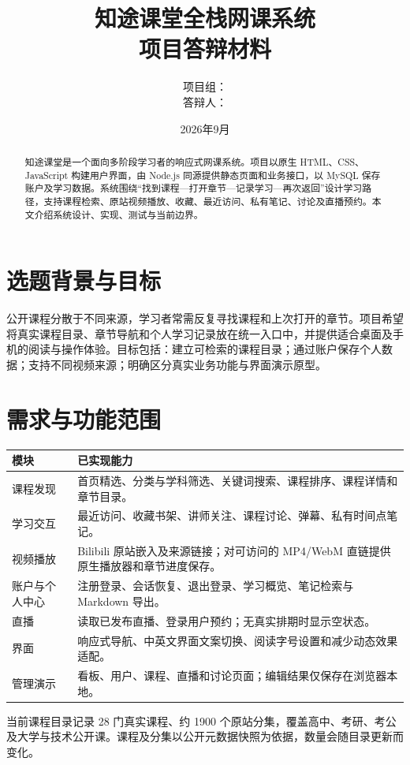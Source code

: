 \documentclass[UTF8,12pt,a4paper]{ctexart}
\title{知途课堂全栈网课系统\\项目答辩材料}
\author{项目组：\underline{\hspace{6cm}}\\答辩人：\underline{\hspace{6cm}}}
\date{2026年9月}
\begin{document}
\maketitle
\begin{abstract}
知途课堂是一个面向多阶段学习者的响应式网课系统。项目以原生 HTML、CSS、JavaScript 构建用户界面，由 Node.js 同源提供静态页面和业务接口，以 MySQL 保存账户及学习数据。系统围绕“找到课程—打开章节—记录学习—再次返回”设计学习路径，支持课程检索、原站视频播放、收藏、最近访问、私有笔记、讨论及直播预约。本文介绍系统设计、实现、测试与当前边界。
\end{abstract}
\tableofcontents
\newpage
\section{选题背景与目标}
公开课程分散于不同来源，学习者常需反复寻找课程和上次打开的章节。项目希望将真实课程目录、章节导航和个人学习记录放在统一入口中，并提供适合桌面及手机的阅读与操作体验。目标包括：建立可检索的课程目录；通过账户保存个人数据；支持不同视频来源；明确区分真实业务功能与界面演示原型。

\section{需求与功能范围}
\begin{longtable}{p{}p{}}
\toprule 模块 & 已实现能力 \\ \midrule
课程发现 & 首页精选、分类与学科筛选、关键词搜索、课程排序、课程详情和章节目录。 \\
学习交互 & 最近访问、收藏书架、讲师关注、课程讨论、弹幕、私有时间点笔记。 \\
视频播放 & Bilibili 原站嵌入及来源链接；对可访问的 MP4/WebM 直链提供原生播放器和章节进度保存。 \\
账户与个人中心 & 注册登录、会话恢复、退出登录、学习概览、笔记检索与 Markdown 导出。 \\
直播 & 读取已发布直播、登录用户预约；无真实排期时显示空状态。 \\
界面 & 响应式导航、中英文界面文案切换、阅读字号设置和减少动态效果适配。 \\
管理演示 & 看板、用户、课程、直播和讨论页面；编辑结果仅保存在浏览器本地。 \\
\bottomrule
\end{longtable}
当前课程目录记录 28 门真实课程、约 1900 个原站分集，覆盖高中、考研、考公及大学与技术公开课。课程及分集以公开元数据快照为依据，数量会随目录更新而变化。
\end{document}
